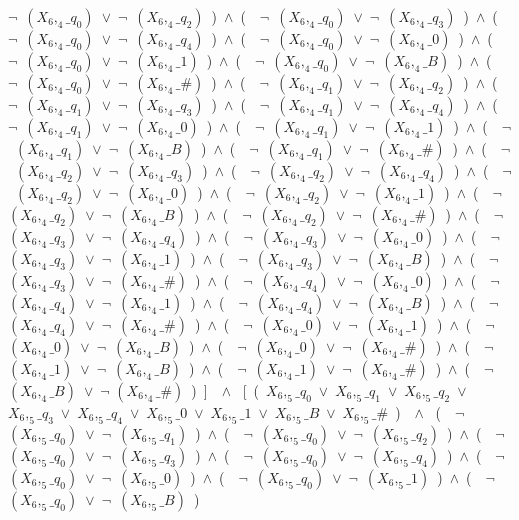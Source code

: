 ﻿\documentclass[a4paper,10pt]{article}
\begin{document}
$\neg$\ $(X_6,_4\_q_0)$\ $\vee$\ $\neg$\ $(X_6,_4\_q_2)$\ )\ $\wedge$\ (\ \ $\neg$\ $(X_6,_4\_q_0)$\ $\vee$\ $\neg$\ $(X_6,_4\_q_3)$\ )\ $\wedge$\ (\ \ $\neg$\ $(X_6,_4\_q_0)$\ $\vee$\ $\neg$\ $(X_6,_4\_q_4)$\ )\ $\wedge$\ (\ \ $\neg$\ $(X_6,_4\_q_0)$\ $\vee$\ $\neg$\ $(X_6,_4\_0)$\ )\ $\wedge$\ (\ \ $\neg$\ $(X_6,_4\_q_0)$\ $\vee$\ $\neg$\ $(X_6,_4\_1)$\ )\ $\wedge$\ (\ \ $\neg$\ $(X_6,_4\_q_0)$\ $\vee$\ $\neg$\ $(X_6,_4\_B)$\ )\ $\wedge$\ (\ \ $\neg$\ $(X_6,_4\_q_0)$\ $\vee$\ $\neg$\ $(X_6,_4\_\#)$\ )\ $\wedge$\ (\ \ $\neg$\ $(X_6,_4\_q_1)$\ $\vee$\ $\neg$\ $(X_6,_4\_q_2)$\ )\ $\wedge$\ (\ \ $\neg$\ $(X_6,_4\_q_1)$\ $\vee$\ $\neg$\ $(X_6,_4\_q_3)$\ )\ $\wedge$\ (\ \ $\neg$\ $(X_6,_4\_q_1)$\ $\vee$\ $\neg$\ $(X_6,_4\_q_4)$\ )\ $\wedge$\ (\ \ $\neg$\ $(X_6,_4\_q_1)$\ $\vee$\ $\neg$\ $(X_6,_4\_0)$\ )\ $\wedge$\ (\ \ $\neg$\ $(X_6,_4\_q_1)$\ $\vee$\ $\neg$\ $(X_6,_4\_1)$\ )\ $\wedge$\ (\ \ $\neg$\ $(X_6,_4\_q_1)$\ $\vee$\ $\neg$\ $(X_6,_4\_B)$\ )\ $\wedge$\ (\ \ $\neg$\ $(X_6,_4\_q_1)$\ $\vee$\ $\neg$\ $(X_6,_4\_\#)$\ )\ $\wedge$\ (\ \ $\neg$\ $(X_6,_4\_q_2)$\ $\vee$\ $\neg$\ $(X_6,_4\_q_3)$\ )\ $\wedge$\ (\ \ $\neg$\ $(X_6,_4\_q_2)$\ $\vee$\ $\neg$\ $(X_6,_4\_q_4)$\ )\ $\wedge$\ (\ \ $\neg$\ $(X_6,_4\_q_2)$\ $\vee$\ $\neg$\ $(X_6,_4\_0)$\ )\ $\wedge$\ (\ \ $\neg$\ $(X_6,_4\_q_2)$\ $\vee$\ $\neg$\ $(X_6,_4\_1)$\ )\ $\wedge$\ (\ \ $\neg$\ $(X_6,_4\_q_2)$\ $\vee$\ $\neg$\ $(X_6,_4\_B)$\ )\ $\wedge$\ (\ \ $\neg$\ $(X_6,_4\_q_2)$\ $\vee$\ $\neg$\ $(X_6,_4\_\#)$\ )\ $\wedge$\ (\ \ $\neg$\ $(X_6,_4\_q_3)$\ $\vee$\ $\neg$\ $(X_6,_4\_q_4)$\ )\ $\wedge$\ (\ \ $\neg$\ $(X_6,_4\_q_3)$\ $\vee$\ $\neg$\ $(X_6,_4\_0)$\ )\ $\wedge$\ (\ \ $\neg$\ $(X_6,_4\_q_3)$\ $\vee$\ $\neg$\ $(X_6,_4\_1)$\ )\ $\wedge$\ (\ \ $\neg$\ $(X_6,_4\_q_3)$\ $\vee$\ $\neg$\ $(X_6,_4\_B)$\ )\ $\wedge$\ (\ \ $\neg$\ $(X_6,_4\_q_3)$\ $\vee$\ $\neg$\ $(X_6,_4\_\#)$\ )\ $\wedge$\ (\ \ $\neg$\ $(X_6,_4\_q_4)$\ $\vee$\ $\neg$\ $(X_6,_4\_0)$\ )\ $\wedge$\ (\ \ $\neg$\ $(X_6,_4\_q_4)$\ $\vee$\ $\neg$\ $(X_6,_4\_1)$\ )\ $\wedge$\ (\ \ $\neg$\ $(X_6,_4\_q_4)$\ $\vee$\ $\neg$\ $(X_6,_4\_B)$\ )\ $\wedge$\ (\ \ $\neg$\ $(X_6,_4\_q_4)$\ $\vee$\ $\neg$\ $(X_6,_4\_\#)$\ )\ $\wedge$\ (\ \ $\neg$\ $(X_6,_4\_0)$\ $\vee$\ $\neg$\ $(X_6,_4\_1)$\ )\ $\wedge$\ (\ \ $\neg$\ $(X_6,_4\_0)$\ $\vee$\ $\neg$\ $(X_6,_4\_B)$\ )\ $\wedge$\ (\ \ $\neg$\ $(X_6,_4\_0)$\ $\vee$\ $\neg$\ $(X_6,_4\_\#)$\ )\ $\wedge$\ (\ \ $\neg$\ $(X_6,_4\_1)$\ $\vee$\ $\neg$\ $(X_6,_4\_B)$\ )\ $\wedge$\ (\ \ $\neg$\ $(X_6,_4\_1)$\ $\vee$\ $\neg$\ $(X_6,_4\_\#)$\ )\ $\wedge$\ (\ \ $\neg$ $(X_6,_4\_B)$\ $\vee$\ $\neg$ $(X_6,_4\_\#)$\ )\ ]\ \ $\wedge$ \ [\ (\ $X_6,_5\_q_0$\ $\vee$\ $X_6,_5\_q_1$\ $\vee$\ $X_6,_5\_q_2$\ $\vee$\ $X_6,_5\_q_3$\ $\vee$\ $X_6,_5\_q_4$\ $\vee$\ $X_6,_5\_0$\ $\vee$\ $X_6,_5\_1$\ $\vee$\ $X_6,_5\_B$\ $\vee$\ $X_6,_5\_\#$\ )\ \ $\wedge$ \ (\ \ $\neg$\ $(X_6,_5\_q_0)$\ $\vee$\ $\neg$\ $(X_6,_5\_q_1)$\ )\ $\wedge$\ (\ \ $\neg$\ $(X_6,_5\_q_0)$\ $\vee$\ $\neg$\ $(X_6,_5\_q_2)$\ )\ $\wedge$\ (\ \ $\neg$\ $(X_6,_5\_q_0)$\ $\vee$\ $\neg$\ $(X_6,_5\_q_3)$\ )\ $\wedge$\ (\ \ $\neg$\ $(X_6,_5\_q_0)$\ $\vee$\ $\neg$\ $(X_6,_5\_q_4)$\ )\ $\wedge$\ (\ \ $\neg$\ $(X_6,_5\_q_0)$\ $\vee$\ $\neg$\ $(X_6,_5\_0)$\ )\ $\wedge$\ (\ \ $\neg$\ $(X_6,_5\_q_0)$\ $\vee$\ $\neg$\ $(X_6,_5\_1)$\ )\ $\wedge$\ (\ \ $\neg$\ $(X_6,_5\_q_0)$\ $\vee$\ $\neg$\ $(X_6,_5\_B)$\ )\ 
\end{document}
